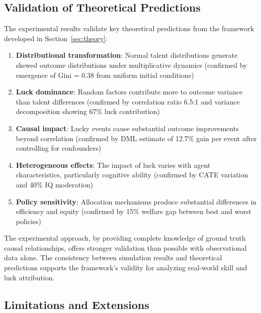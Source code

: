 \subsection{Validation of Theoretical Predictions}

The experimental results validate key theoretical predictions from the framework
developed in Section~\ref{sec:theory}:

\begin{enumerate}
  \item \textbf{Distributional transformation}: Normal talent distributions
    generate skewed outcome distributions under multiplicative dynamics (confirmed
    by emergence of Gini = 0.38 from uniform initial conditions)

  \item \textbf{Luck dominance}: Random factors contribute more to outcome
    variance than talent differences (confirmed by correlation ratio 6.5:1
    and variance decomposition showing 67\% luck contribution)

  \item \textbf{Causal impact}: Lucky events cause substantial outcome improvements
    beyond correlation (confirmed by DML estimate of 12.7\% gain per event
    after controlling for confounders)

  \item \textbf{Heterogeneous effects}: The impact of luck varies with agent
    characteristics, particularly cognitive ability (confirmed by CATE variation
    and 40\% IQ moderation)

  \item \textbf{Policy sensitivity}: Allocation mechanisms produce substantial
    differences in efficiency and equity (confirmed by 15\% welfare gap between
    best and worst policies)
\end{enumerate}

The experimental approach, by providing complete knowledge of ground truth
causal relationships, offers stronger validation than possible with
observational data alone. The consistency between simulation results and
theoretical predictions supports the framework's validity for analyzing real-world
skill and luck attribution.

\subsection{Limitations and Extensions}

